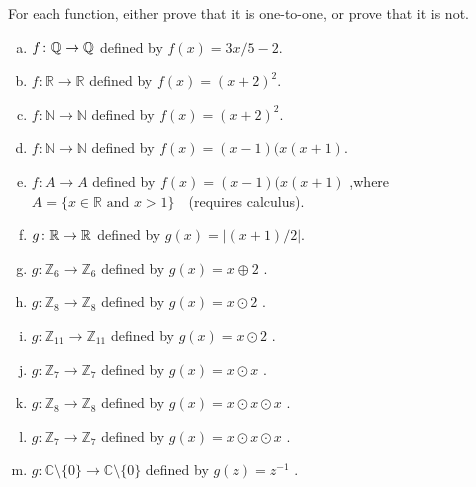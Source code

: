 \begin{exercise}{40} 
For each function, either prove that it is one-to-one, or prove that it is not.
\begin{enumerate}[(a)]
\item \label{IsIt11?-linear}
 $f \colon \mathbb{Q} \to \mathbb{Q}$ defined by $f(x)=3x/5 - 2$.
\item \label{IsIt11?-square0}
 $f \colon {\mathbb R} \to {\mathbb R}$ defined by $f(x)=(x+2)^2$.
\item \label{IsIt11?-square}
 $f \colon {\mathbb N} \to {\mathbb N}$ defined by $f(x)=(x+2)^2$.
\item
 $f \colon {\mathbb N} \to {\mathbb N}$ defined by $f(x)=(x-1)(x(x+1)$.
\item
 $f \colon A \to A$ defined by $f(x)=(x-1)(x(x+1)$ ,where \\
 $A =\{x \in \mathbb{R} \text{ and }x >1 \}$~~(requires calculus).
\item \label{IsIt11?-abs}
 $g \colon \mathbb{R} \to \mathbb{R}$ defined by $g(x)= \left|(x+1)/2 \right|$.
\item \label{modular_g}
 $g \colon {\mathbb Z}_6 \to {\mathbb Z}_6$ defined by $g(x)= x \oplus 2$ .
\item \label{modular_m}
 $g \colon {\mathbb Z}_8 \to {\mathbb Z}_8$ defined by $g(x) = x \odot 2 $ .
\item \label{modular_m2}
 $g \colon {\mathbb Z}_{11} \to {\mathbb Z}_{11}$ defined by $g(x) =  x \odot 2$ .
\item 
 $g \colon {\mathbb Z}_7 \to {\mathbb Z}_7$ defined by $g(x)= x \odot x$ .
\item 
 $g \colon {\mathbb Z}_8 \to {\mathbb Z}_8$ defined by $g(x)= x \odot x \odot x$ .
\item 
 $g \colon {\mathbb Z}_7 \to {\mathbb Z}_7$ defined by $g(x)= x \odot x \odot x$ .
\item
 $g \colon {\mathbb C}\setminus \{0\}  \to {\mathbb C}\setminus \{0\} $ defined by $g(z) =  z^{-1}$ .
 \end{enumerate}
\end{exercise}



